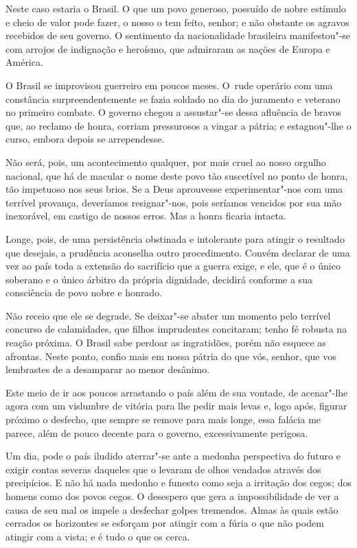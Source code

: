 Neste caso estaria o Brasil. O que um povo generoso, possuído de nobre
estímulo e cheio de valor pode fazer, o nosso o tem feito, senhor; e
não obstante os agravos recebidos de seu governo. O sentimento da
nacionalidade brasileira manifestou"-se com arrojos de indignação e
heroísmo, que admiraram as nações de Europa e América.

O Brasil se improvisou guerreiro em poucos meses. \mbox{O rude} operário com
uma constância surpreendentemente se fazia soldado no dia do juramento
e veterano no primeiro combate. O governo chegou a assustar"-se dessa
afluência de bravos que, ao reclamo de honra, corriam pressurosos a
vingar a pátria; e estagnou"-lhe o curso, embora depois se arrependesse. 

Não será, pois, um acontecimento qualquer, por mais cruel ao nosso
orgulho nacional, que há de macular o nome deste povo tão suscetível no
ponto de honra, tão impetuoso nos seus brios. Se a Deus aprouvesse
experimentar"-nos com uma terrível provança, deveríamos
resignar"-nos, pois seríamos vencidos por sua mão inexorável, em
castigo de nossos erros. Mas a honra ficaria intacta. 

Longe, pois, de uma persistência obstinada e intolerante para atingir o
resultado que desejais, a prudência aconselha outro procedimento.
Convém declarar de uma vez ao país toda a extensão do sacrifício que a
guerra exige, e ele, que é o único soberano e o único árbitro da
própria dignidade, decidirá conforme a sua consciência de povo nobre e honrado. 

Não receio que ele se degrade. Se deixar"-se abater um momento pelo
terrível concurso de calamidades, que filhos imprudentes concitaram;
tenho fé robusta na reação próxima. O Brasil sabe perdoar as
ingratidões, porém não esquece as afrontas. Neste ponto, confio mais em
nossa pátria do que vós, senhor, que vos lembrastes de a desamparar ao menor desânimo.

Este meio de ir aos poucos arrastando o país além de sua vontade, de
acenar"-lhe agora com um vislumbre de vitória para lhe pedir mais
levas e, logo após, figurar próximo o desfecho, que sempre se remove
para mais longe, essa falácia me parece, além de pouco decente para o
governo, excessivamente perigosa. 

Um dia, pode o país iludido aterrar"-se ante a medonha perspectiva do
futuro e exigir contas severas daqueles que o levaram de olhos vendados
através dos precipícios. E não há nada medonho e funesto como seja a
irritação dos cegos; dos homens como dos povos cegos. O desespero que
gera a impossibilidade de ver a causa de seu mal os impele a desfechar
golpes tremendos. Almas às quais estão cerrados os horizontes se
esforçam por atingir com a fúria o que não podem atingir com a vista; e
é tudo o que os cerca. 

